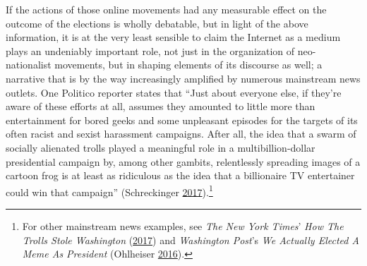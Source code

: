 \documentclass[10pt,british,A4paper,,openany]{memoir}
\begin{document}
If the actions of those online movements had any measurable effect on
the outcome of the elections is wholly debatable, but in light of the
above information, it is at the very least sensible to claim the
Internet as a medium plays an undeniably important role, not just in the
organization of neo-nationalist movements, but in shaping elements of
its discourse as well; a narrative that is by the way increasingly
amplified by numerous mainstream news outlets. One Politico reporter
states that ``Just about everyone else, if they're aware of these
efforts at all, assumes they amounted to little more than entertainment
for bored geeks and some unpleasant episodes for the targets of its
often racist and sexist harassment campaigns. After all, the idea that a
swarm of socially alienated trolls played a meaningful role in a
multibillion-dollar presidential campaign by, among other gambits,
relentlessly spreading images of a cartoon frog is at least as
ridiculous as the idea that a billionaire TV entertainer could win that
campaign'' (Schreckinger
\protect\hyperlink{ref-schreckinger_world_2017}{2017}).\footnote{For
  other mainstream news examples, see \emph{The New York Times}'
  \emph{How The Trolls Stole Washington}
  (\protect\hyperlink{ref-hess_how_2017}{2017}) and \emph{Washington
  Post}'s \emph{We Actually Elected A Meme As President} (Ohlheiser
  \protect\hyperlink{ref-ohlheiser_analysis_2016}{2016}).}
\end{document}
